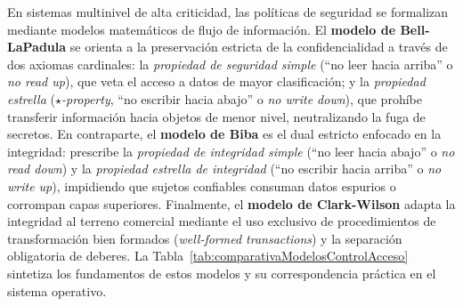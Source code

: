\documentclass[12pt]{article}
\begin{document}
En sistemas multinivel de alta criticidad, las políticas de seguridad se formalizan mediante modelos matemáticos de flujo de información. El \textbf{modelo de Bell-LaPadula} se orienta a la preservación estricta de la confidencialidad a través de dos axiomas cardinales: la \textit{propiedad de seguridad simple} (\enquote{no leer hacia arriba} o \textit{no read up}), que veta el acceso a datos de mayor clasificación; y la \textit{propiedad estrella} (\textit{$\star$-property}, \enquote{no escribir hacia abajo} o \textit{no write down}), que prohíbe transferir información hacia objetos de menor nivel, neutralizando la fuga de secretos. En contraparte, el \textbf{modelo de Biba} es el dual estricto enfocado en la integridad: prescribe la \textit{propiedad de integridad simple} (\enquote{no leer hacia abajo} o \textit{no read down}) y la \textit{propiedad estrella de integridad} (\enquote{no escribir hacia arriba} o \textit{no write up}), impidiendo que sujetos confiables consuman datos espurios o corrompan capas superiores. Finalmente, el \textbf{modelo de Clark-Wilson} adapta la integridad al terreno comercial mediante el uso exclusivo de procedimientos de transformación bien formados (\textit{well-formed transactions}) y la separación obligatoria de deberes. La Tabla~\ref{tab:comparativaModelosControlAcceso} sintetiza los fundamentos de estos modelos y su correspondencia práctica en el sistema operativo.
\end{document}
